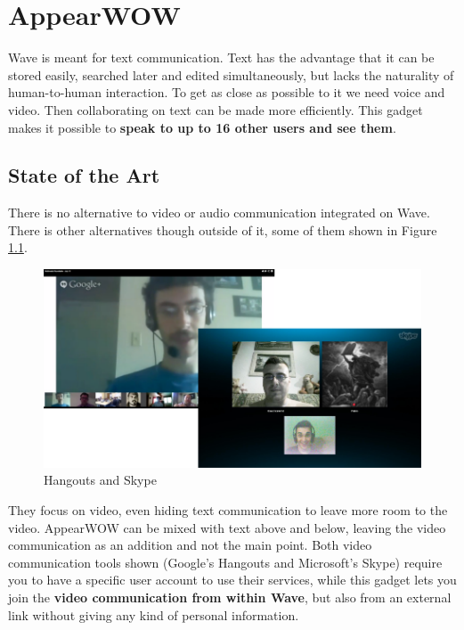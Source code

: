 \thispagestyle{sectioned}
\chapter{AppearWOW}
Wave is meant for text communication. Text has the advantage that it can be stored easily, searched later and edited simultaneously, but lacks the naturality of human-to-human interaction. To get as close as possible to it we need voice and video. Then collaborating on text can be made more efficiently. This gadget makes it possible to \textbf{speak to up to 16 other users and see them}.

\label{subsec:video_soa}
\section{State of the Art}
There is no alternative to video or audio communication integrated on Wave. There is other alternatives though outside of it, some of them shown in Figure \ref{fig:skype_hangouts}.
\begin{figure}[h]
  \center
    \includegraphics[keepaspectratio, scale=0.43]{Media/Captures/Soa/skype_hangouts.png}
  \caption{Hangouts and Skype}
  \label{fig:skype_hangouts}
\end{figure}
They focus on video, even hiding text communication to leave more room to the video. AppearWOW can be mixed with text above and below, leaving the video communication as an addition and not the main point. Both video communication tools shown (Google's Hangouts and Microsoft's Skype) require you to have a specific user account to use their services, while this gadget lets you join the \textbf{video communication from within Wave}, but also from an external link without giving any kind of personal information.

